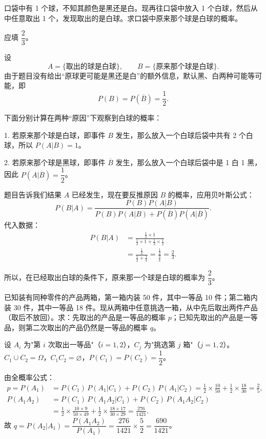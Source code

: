 ﻿\documentclass[lang=cn,11pt]{elegantbook}
\begin{document}
\begin{exercise}\label{exer:1-40}
口袋中有 1 个球，不知其颜色是黑还是白。现再往口袋中放入 1 个白球，然后从中任意取出 1 个，发现取出的是白球。求口袋中原来那个球是白球的概率。
\end{exercise}

\begin{solution}
应填 \(\dfrac{2}{3}\)。

设
\[
A=\{\text{取出的球是白球}\},\qquad B=\{\text{原来那个球是白球}\}.
\]
由于题目没有给出“原球更可能是黑还是白”的额外信息，默认黑、白两种可能等可能，即
\[
P(B)=P(\overline B)=\frac12.
\]

下面分别计算在两种“原因”下观察到白球的概率：

1. 若原来那个球是白球，即事件 \(B\) 发生，那么放入一个白球后袋中共有 2 个白球，所以
\(P(A|B)=1\)。

2. 若原来那个球是黑球，即事件 \(\overline B\) 发生，那么放入一个白球后袋中是 1 白 1 黑，因此
\(P(A|\overline B)=\dfrac12\)。

题目告诉我们结果 \(A\) 已经发生，现在要反推原因 \(B\) 的概率，应用贝叶斯公式：
\[
P(B|A)=\frac{P(B)P(A|B)}{P(B)P(A|B)+P(\overline B)P(A|\overline B)}.
\]
代入数据：
\[
\begin{aligned}
P(B|A)
&=\frac{\frac12\times 1}{\frac12\times 1+\frac12\times\frac12}\\
&=\frac{\frac12}{\frac12+\frac14}
=\frac{\frac12}{\frac34}
=\frac23.
\end{aligned}
\]

所以，在已经取出白球的条件下，原来那一个球是白球的概率为 \(\dfrac{2}{3}\)。
\end{solution}

\begin{exercise}\label{exer:1-41}
已知装有同种零件的产品两箱，第一箱内装 50 件，其中一等品 10 件；第二箱内装 30 件，其中一等品 18 件。现从两箱中任意挑选一箱，从中先后取出两件产品（取后不放回）。求：先取出的产品是一等品的概率 \(p\)；已知先取出的产品是一等品，则第二次取出的产品仍然是一等品的概率 \(q\)。
\end{exercise}

\begin{solution}
设 \(A_i\) 为"第 \(i\) 次取出一等品"（\(i=1,2\)），\(C_j\) 为"挑选第 \(j\) 箱"（\(j=1,2\)）。\(C_1\cup C_2=\Omega\)，\(C_1C_2=\varnothing\)，\(P(C_1)=P(C_2)=\dfrac{1}{2}\)。

由全概率公式：
\begin{align*}
p = P(A_1) &= P(C_1)\,P(A_1|C_1)+P(C_2)\,P(A_1|C_2) = \frac{1}{2}\times\frac{10}{50}+\frac{1}{2}\times\frac{18}{30} = \frac{2}{5}, \\
P(A_1A_2) &= P(C_1)\,P(A_1A_2|C_1)+P(C_2)\,P(A_1A_2|C_2) \\
&= \frac{1}{2}\times\frac{10\times 9}{50\times 49}+\frac{1}{2}\times\frac{18\times 17}{30\times 29} = \frac{276}{1421}.
\end{align*}
故 \(q = P(A_2|A_1) = \dfrac{P(A_1A_2)}{P(A_1)} = \dfrac{276}{1421}\times\dfrac{5}{2} = \dfrac{690}{1421}\)。
\end{solution}
\end{document}
